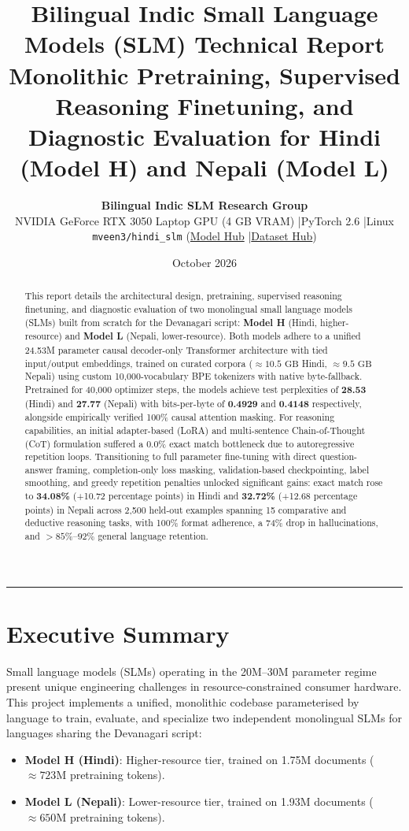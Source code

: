 \documentclass[11pt,a4paper]{article}
\title{\textbf{\LARGE Bilingual Indic Small Language Models (SLM) Technical Report}\\[0.3em]
\Large Monolithic Pretraining, Supervised Reasoning Finetuning, and Diagnostic Evaluation for Hindi (Model H) and Nepali (Model L)}
\author{\textbf{Bilingual Indic SLM Research Group} \\
\normalsize NVIDIA GeForce RTX 3050 Laptop GPU (4 GB VRAM) \quad|\quad PyTorch 2.6 \quad|\quad Linux \\
\normalsize \texttt{mveen3/hindi\_slm} (\href{https://huggingface.co/mveen3/hindi_slm}{Model Hub} \quad|\quad \href{https://huggingface.co/datasets/mveen3/hindi_slm}{Dataset Hub})}
\date{October 2026}
\begin{document}
\maketitle

\begin{abstract}
This report details the architectural design, pretraining, supervised reasoning finetuning, and diagnostic evaluation of two monolingual small language models (SLMs) built from scratch for the Devanagari script: \textbf{Model H} (Hindi, higher-resource) and \textbf{Model L} (Nepali, lower-resource). Both models adhere to a unified 24.53M parameter causal decoder-only Transformer architecture with tied input/output embeddings, trained on curated corpora ($\approx 10.5\text{ GB}$ Hindi, $\approx 9.5\text{ GB}$ Nepali) using custom 10,000-vocabulary BPE tokenizers with native byte-fallback. Pretrained for 40,000 optimizer steps, the models achieve test perplexities of \textbf{28.53} (Hindi) and \textbf{27.77} (Nepali) with bits-per-byte of \textbf{0.4929} and \textbf{0.4148} respectively, alongside empirically verified 100\% causal attention masking. For reasoning capabilities, an initial adapter-based (LoRA) and multi-sentence Chain-of-Thought (CoT) formulation suffered a 0.0\% exact match bottleneck due to autoregressive repetition loops. Transitioning to full parameter fine-tuning with direct question-answer framing, completion-only loss masking, validation-based checkpointing, label smoothing, and greedy repetition penalties unlocked significant gains: exact match rose to \textbf{34.08\%} (+10.72 percentage points) in Hindi and \textbf{32.72\%} (+12.68 percentage points) in Nepali across 2,500 held-out examples spanning 15 comparative and deductive reasoning tasks, with 100\% format adherence, a 74\% drop in hallucinations, and $> 85\%\text{--}92\%$ general language retention.
\end{abstract}

\vspace{0.5em}
\hrule
\vspace{1.5em}

\section{Executive Summary}

Small language models (SLMs) operating in the 20M--30M parameter regime present unique engineering challenges in resource-constrained consumer hardware. This project implements a unified, monolithic codebase parameterised by language to train, evaluate, and specialize two independent monolingual SLMs for languages sharing the Devanagari script:
\begin{itemize}[noitemsep]
    \item \textbf{Model H (Hindi)}: Higher-resource tier, trained on 1.75M documents ($\approx 723\text{M}$ pretraining tokens).
    \item \textbf{Model L (Nepali)}: Lower-resource tier, trained on 1.93M documents ($\approx 650\text{M}$ pretraining tokens).
\end{itemize}
\end{document}
